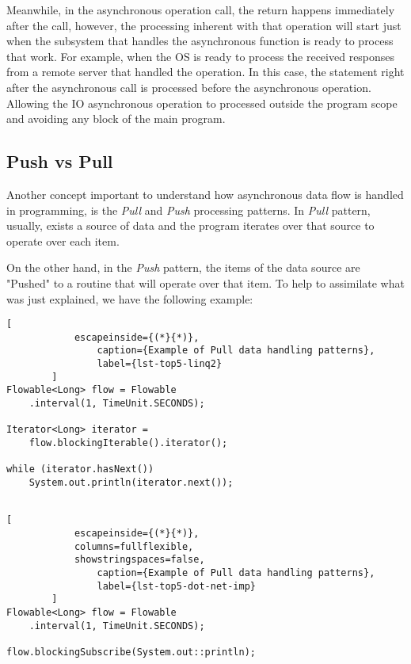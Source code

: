 	Meanwhile, in the asynchronous operation call, the return happens immediately after the call, however, the processing inherent with that operation will start just when the subsystem that handles the asynchronous function is ready to process that work. For example, when the OS is ready to process the received responses from a remote server that handled the operation.
	In this case, the statement right after the asynchronous call is processed before the asynchronous operation. Allowing the IO asynchronous operation to processed outside the program scope and avoiding any block of the main program.


	\subsection{Push vs Pull}
	Another concept important to understand how asynchronous data flow is handled in programming, is the \textit{Pull} and \textit{Push} processing patterns.
	In \textit{Pull} pattern, usually, exists a source of data and the program iterates over that source to operate over each item. 
	
	On the other hand, in the \textit{Push} pattern, the items of the data source are "Pushed" to a routine that will operate over that item.
	To help to assimilate what was just explained, we have the following example:


	\begin{center}
		\lstset{basicstyle=\scriptsize\ttfamily,frame=bottomline}
		\begin{minipage}[t][][b]{.46\textwidth}
		\begin{lstlisting}[
			escapeinside={(*}{*)},
				caption={Example of Pull data handling patterns},
				label={lst-top5-linq2}
		]
Flowable<Long> flow = Flowable
	.interval(1, TimeUnit.SECONDS);

Iterator<Long> iterator = 
	flow.blockingIterable().iterator();

while (iterator.hasNext()) 
	System.out.println(iterator.next());
		
		\end{lstlisting}
		\end{minipage}
		\hfill
		\begin{minipage}{.48\textwidth}
		\lstset{basicstyle=\scriptsize\ttfamily,frame=bottomline}
		\begin{lstlisting}[
			escapeinside={(*}{*)},
			columns=fullflexible,
			showstringspaces=false,
				caption={Example of Pull data handling patterns},
				label={lst-top5-dot-net-imp}
		]
Flowable<Long> flow = Flowable
	.interval(1, TimeUnit.SECONDS);

flow.blockingSubscribe(System.out::println);

		\end{lstlisting}
		\end{minipage}
	\end{center}


